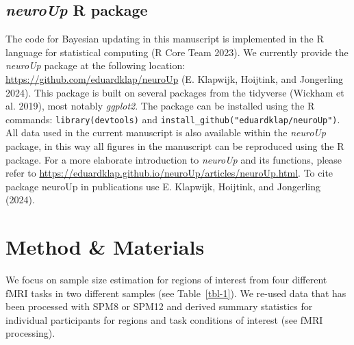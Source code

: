 \documentclass[
  letterpaper,
  DIV=11,
  numbers=noendperiod]{scrartcl}
\begin{document}
\subsection{\texorpdfstring{\emph{neuroUp} R
package}{neuroUp R package}}\label{neuroup-r-package}

The code for Bayesian updating in this manuscript is implemented in the
R language for statistical computing (R Core Team 2023). We currently
provide the \emph{neuroUp} package at the following location:
\url{https://github.com/eduardklap/neuroUp} (E. Klapwijk, Hoijtink, and
Jongerling 2024). This package is built on several packages from the
tidyverse (Wickham et al. 2019), most notably \emph{ggplot2}. The
package can be installed using the R commands:
\texttt{library(devtools)} and
\texttt{install\_github("eduardklap/neuroUp")}. All data used in the
current manuscript is also available within the \emph{neuroUp} package,
in this way all figures in the manuscript can be reproduced using the R
package. For a more elaborate introduction to \emph{neuroUp} and its
functions, please refer to
\url{https://eduardklap.github.io/neuroUp/articles/neuroUp.html}. To
cite package neuroUp in publications use E. Klapwijk, Hoijtink, and
Jongerling (2024).

\section{Method \& Materials}\label{method-materials}

We focus on sample size estimation for regions of interest from four
different fMRI tasks in two different samples (see Table~\ref{tbl-1}).
We re-used data that has been processed with SPM8 or SPM12 and derived
summary statistics for individual participants for regions and task
conditions of interest (see fMRI processing).
\end{document}
